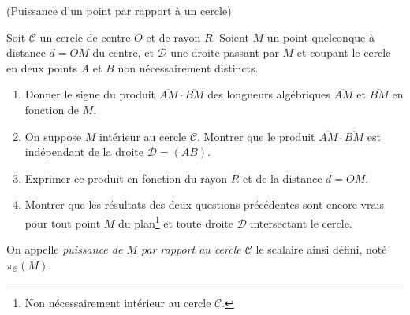 \documentclass[a4paper,12pt,reqno]{amsart}
\newcommand{\cC}{\mathcal C}
\newcommand{\cD}{\mathcal D}
\begin{document}


\begin{exo} (Puissance d'un point par rapport à un cercle)

  Soit $\cC$ un cercle de centre $O$ et de rayon $R$. Soient $M$ un point quelconque à distance $d=OM$ du centre, et $\cD$ une droite passant par $M$ et coupant le cercle en deux points $A$ et $B$ non nécessairement distincts.
  \begin{enumerate}
    \item Donner le signe du produit $\overline{AM}\cdot\overline{BM}$ des longueurs algébriques $\overline{AM}$ et $\overline{BM}$ en fonction de $M$.
    \item On suppose $M$ intérieur au cercle $\cC$. Montrer que le produit $\overline{AM}\cdot\overline{BM}$ est indépendant de la droite $\cD=(AB)$.
    \item Exprimer ce produit en fonction du rayon $R$ et de la distance $d=OM$.
    \item Montrer que les résultats des deux questions précédentes sont encore vrais pour tout point $M$ du plan\footnote{Non nécessairement intérieur au cercle $\cC$.} et toute droite $\cD$ intersectant le cercle.
  \end{enumerate}
  On appelle \emph{puissance de $M$ par rapport au cercle $\cC$} le scalaire ainsi défini, noté $\pi_{\cC}(M)$.
\end{exo}
\end{document}
